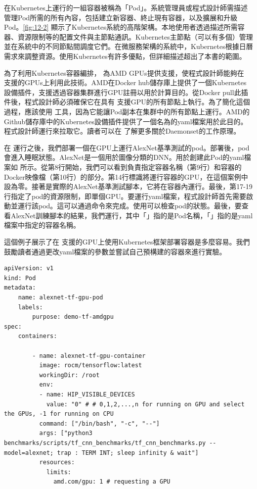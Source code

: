 在Kubernetes上運行的一組容器被稱為「Pod」。系統管理員或程式設計師需描述管理Pod所需的所有內容，包括建立新容器、終止現有容器，以及擴展和升級Pod。\autoref{fig:12-2} 顯示了Kubernetes系統的高階架構。本地使用者透過描述所需容器、資源限制等的配置文件與主節點通訊。Kubernetes主節點（可以有多個）管理並在系統中的不同節點間調度它們。在微服務架構的系統中，Kubernetes根據日曆需求來調整資源。使用Kubernetes有許多優點，但詳細描述超出了本書的範圍。

為了利用Kubernetes容器編排， 為AMD GPUs提供支援，使程式設計師能夠在  支援的GPUs上利用此技術。AMD在Docker hub儲存庫上提供了一個Kubernetes設備插件，支援透過容器集群進行GPU註冊以用於計算目的。從Docker pull此插件後，程式設計師必須確保它在具有  支援GPU的所有節點上執行。為了簡化這個過程，應該使用  工具，因為它能讓Pod副本在集群中的所有節點上運行。AMD的Github儲存庫中的Kubernetes設備插件提供了一個名為的yaml檔案用於此目的。程式設計師運行來拉取它。讀者可以在 \cite{Kubernetes-Documentation} 了解更多關於Daemonset的工作原理。

在  運行之後，我們部署一個在GPU上運行AlexNet基準測試的pod。部署後，pod會進入睡眠狀態。AlexNet是一個用於圖像分類的DNN。用於創建此Pod的yaml檔案如  所示。從第8行開始，我們可以看到負責指定容器名稱（第9行）和容器的Docker映像檔（第10行）的部分。第14行標識將運行容器的GPU，在這個案例中設為零。接著是實際的AlexNet基準測試腳本，它將在容器內運行。最後，第17-19行指定了pod的資源限制，即單個GPU。要運行yaml檔案，程式設計師首先需要啟動並運行該pod。這可以通過命令來完成。使用可以檢查pod的狀態。最後，要查看AlexNet訓練腳本的結果，我們運行，其中「」指的是Pod名稱，「」指的是yaml檔案中指定的容器名稱。

這個例子展示了在  支援的GPU上使用Kubernetes框架部署容器是多麼容易。我們鼓勵讀者通過更改yaml檔案的參數並嘗試自己預構建的容器來進行實驗。

\begin{lstlisting}[numbers=none, caption={在Kubernetes平台上執行AlexNet基準測試的配置文件}, captionpos=t, label={lst:config_file+exe_alexnetink8s}]
apiVersion: v1
kind: Pod
metadata:
    name: alexnet-tf-gpu-pod
    labels:
        purpose: demo-tf-amdgpu
spec:
    containers:

        - name: alexnet-tf-gpu-container
          image: rocm/tensorflow:latest
          workingDir: /root
          env:
          - name: HIP_VISIBLE_DEVICES
            value: "0" # # 0,1,2,...,n for running on GPU and select the GPUs, -1 for running on CPU
          command: ["/bin/bash", "-c", "--"]
          args: ["python3 benchmarks/scripts/tf_cnn_benchmarks/tf_cnn_benchmarks.py --model=alexnet; trap : TERM INT; sleep infinity & wait"]
          resources:
            limits:
              amd.com/gpu: 1 # requesting a GPU
\end{lstlisting}

